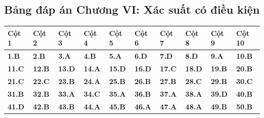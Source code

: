 \documentclass[11pt,a4paper]{article}
\begin{document}
\subsection*{\color{primary} Bảng đáp án Chương VI: Xác suất có điều kiện}
\begin{center}
\renewcommand{\arraystretch}{1.25}
\begin{tabularx}{\textwidth}{*{10}{>{\centering\arraybackslash}X}}
\toprule
\textbf{\color{primary} Cột 1} & \textbf{\color{primary} Cột 2} & \textbf{\color{primary} Cột 3} & \textbf{\color{primary} Cột 4} & \textbf{\color{primary} Cột 5} & \textbf{\color{primary} Cột 6} & \textbf{\color{primary} Cột 7} & \textbf{\color{primary} Cột 8} & \textbf{\color{primary} Cột 9} & \textbf{\color{primary} Cột 10} \\
\midrule
\textbf{1.B} & \textbf{2.B} & \textbf{3.A} & \textbf{4.B} & \textbf{5.A} & \textbf{6.D} & \textbf{7.D} & \textbf{8.D} & \textbf{9.A} & \textbf{10.B} \\
\rowcolor{rowtint} \textbf{11.C} & \textbf{12.B} & \textbf{13.D} & \textbf{14.A} & \textbf{15.D} & \textbf{16.D} & \textbf{17.C} & \textbf{18.D} & \textbf{19.B} & \textbf{20.B} \\
\textbf{21.C} & \textbf{22.C} & \textbf{23.B} & \textbf{24.A} & \textbf{25.B} & \textbf{26.B} & \textbf{27.B} & \textbf{28.C} & \textbf{29.B} & \textbf{30.C} \\
\rowcolor{rowtint} \textbf{31.B} & \textbf{32.B} & \textbf{33.A} & \textbf{34.C} & \textbf{35.A} & \textbf{36.B} & \textbf{37.A} & \textbf{38.A} & \textbf{39.D} & \textbf{40.B} \\
\textbf{41.D} & \textbf{42.B} & \textbf{43.B} & \textbf{44.A} & \textbf{45.B} & \textbf{46.A} & \textbf{47.A} & \textbf{48.A} & \textbf{49.B} & \textbf{50.B} \\
\bottomrule
\end{tabularx}
\end{center}\vspace{10pt}
\end{document}

